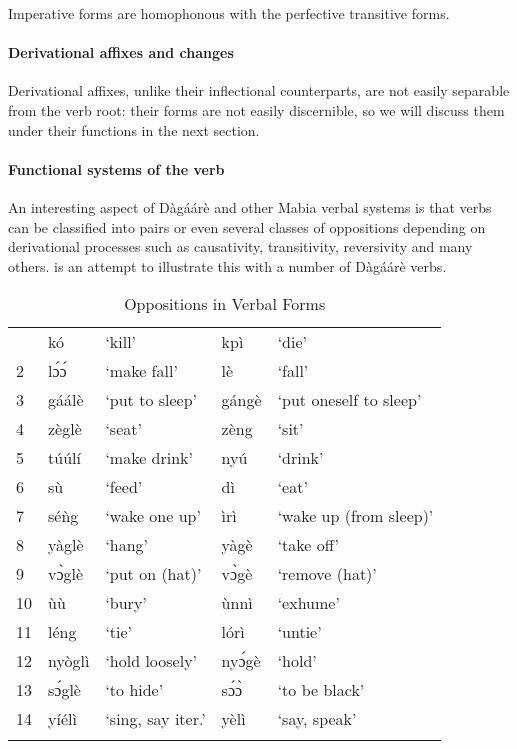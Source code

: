 Imperative forms are homophonous with the perfective transitive forms.

\paragraph{Derivational affixes and changes}

Derivational affixes, unlike their inflectional counterparts, are not easily separable
from the verb root: their forms are not easily discernible, so we will discuss them under their
functions in the next section.

\paragraph{Functional systems of the verb}
An interesting aspect of Dàgáárè and other Mabia verbal systems is that verbs can
be classified into pairs or even several classes of oppositions depending on derivational
processes such as causativity, transitivity, reversivity and many others.  is an
attempt to illustrate this with a number of Dàgáárè verbs.

\begin{table}
    \begin{tabular}{lllll}
    \lsptoprule
1 &kó &‘kill’ &kpì &‘die’\\
2 &lɔ́ɔ́& ‘make fall’& lè& ‘fall’\\
3 &gáálè& ‘put to sleep’& gángè &‘put oneself to sleep’\\
4 &zèglè &‘seat’& zèng &‘sit’\\
5& túúlí& ‘make drink’ &nyú &‘drink’\\
6 &sù &‘feed’ &dì & ‘eat’\\
7& séǹg& ‘wake one up’ &ìrì &‘wake up (from sleep)’\\
8& yàglè& ‘hang’& yàgè& ‘take off’\\
9 &vɔ̀glè &‘put on (hat)’ &vɔ̀gè &‘remove (hat)’\\
10 &ùù &‘bury’ &ùnnì &‘exhume’\\
11 &léng &‘tie’ &lórì &‘untie’\\
12 &nyòglì &‘hold loosely’ &nyɔ́gè &‘hold’\\
13& sɔ́glè &‘to hide’ &sɔ́ɔ̀ &‘to be black’\\
14 &yíélì& ‘sing, say iter.' &yèlì& ‘say, speak’\\
\lspbottomrule
    \end{tabular}
    \caption{Oppositions in Verbal Forms}
    \label{tab:verbOppositions}
\end{table}

